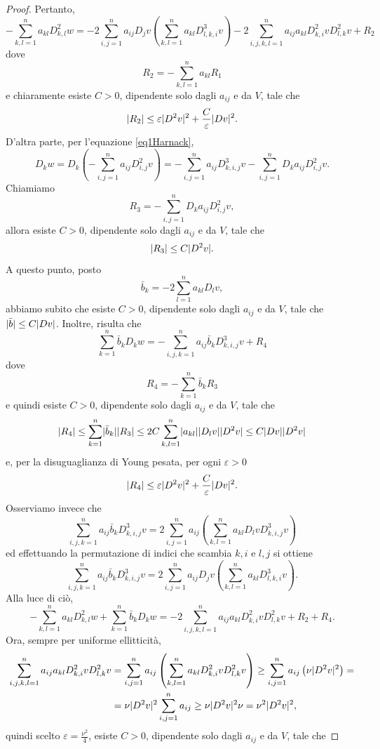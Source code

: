 \begin{proof}
	Pertanto, 
	\[ -\sum_{k,l=1}^{n}a_{kl}D^2_{k,l}w = -2 \sum_{i,j=1}^na_{ij}D_j v \left( \sum_{k,l=1}^n a_{kl}D^3_{l,k,i} v\right)  - 2 \sum_{i,j,k,l=1}^{n} a_{ij}a_{kl}D^2_{k,i}v D^2_{l,k} v + R_2 \]
	dove 
	\[ R_2 = -\sum_{k,l=1}^n a_{kl} R_1 \]
	e chiaramente esiste $C>0$, dipendente solo dagli $a_{ij}$ e da $V$, tale che
	\[ \lvert R_2\rvert \le \varepsilon \lvert D^2 v\rvert^2 + \frac{C}{\varepsilon}\lvert Dv\rvert^2. \]
	D'altra parte, per l'equazione \eqref{eq1Harnack},
	\[ D_k w = D_k \left(-\sum_{i,j=1}^{n}a_{ij}D^2_{i,j}v\right) = - \sum_{i,j=1}^na_{ij}D^3_{k,i,j}v - \sum_{i,j=1}^n D_ka_{ij} D^2_{i,j} v.  \]
	Chiamiamo 
	\[ R_3 = - \sum_{i,j=1}^n D_ka_{ij} D^2_{i,j} v, \]
	allora esiste $C>0$, dipendente solo dagli $a_{ij}$ e da $V$, tale che
	\[ \lvert R_3\rvert \le C \lvert D^2v\rvert. \]
	A questo punto, posto
	\[ \bar{b}_k = -2\sum_{l=1}^{n}a_{kl}D_l v, \]
	abbiamo subito che esiste $C>0$, dipendente solo dagli $a_{ij}$ e da $V$, tale che  $\lvert\bar{b}\rvert \le C \lvert Dv\rvert$. Inoltre, risulta che 
	\[ \sum_{k=1}^{n} \bar{b}_k D_k w = -\sum_{i,j,k=1}^{n} a_{ij}\bar{b}_k D^3_{k,i,j} v + R_4 \]
	dove 
	\[ R_4 = -\sum_{k=1}^{n}\bar{b}_k R_3 \]
	e quindi esiste $C>0$, dipendente solo dagli $a_{ij}$ e da $V$, tale che
	\[ \lvert R_4\rvert \le \sum_{k=1}^{n}\lvert\bar{b}_k\rvert \lvert R_3\rvert \le 2C\sum_{k,l=1}^{n} \lvert a_{kl}\rvert \lvert D_l v\rvert\lvert D^2v\rvert \le C\lvert D v\rvert \lvert D^2 v\rvert   \]
	e, per la disuguaglianza di Young pesata, per ogni $\varepsilon > 0$
	\[ \lvert R_4\rvert \le \varepsilon \lvert D^2 v\rvert^2 + \frac{C}{\varepsilon}\lvert Dv\rvert^2. \]
	Osserviamo invece che 
	\[ \sum_{i,j,k=1}^{n} a_{ij}\bar{b}_k D^3_{k,i,j} v = 2 \sum_{i,j=1}^n a_{ij}\left( \sum_{k,l=1}^n a_{kl} D_l v D^3_{k,i,j} v\right)  \]
	ed effettuando la permutazione di indici che scambia $k,i$ e $l,j$ si ottiene
	\[  \sum_{i,j,k=1}^{n} a_{ij}\bar{b}_k D^3_{k,i,j} v = 2 \sum_{i,j=1}^na_{ij}D_j v \left( \sum_{k,l=1}^n a_{kl}D^3_{l,k,i} v\right). \]
	Alla luce di ciò, 
	\[ -\sum_{k,l=1}^{n}a_{kl}D^2_{k,l}w + \sum_{k=1}^{n} \bar{b}_k D_k w =  - 2 \sum_{i,j,k,l=1}^{n} a_{ij}a_{kl}D^2_{k,i}v D^2_{l,k} v + R_2 + R_4.  \]
	Ora, sempre per uniforme ellitticità, 
	\begin{align*}
		\sum_{i,j,k,l=1}^{n} a_{ij}a_{kl}D^2_{k,i}v D^2_{l,k} v &= \sum_{i,j=1}^{n}  a_{ij} \left( \sum_{k,l=1}^n a_{kl} D^2_{k,i}v D^2_{l,k} v \right) \ge \sum_{i,j=1}^{n}  a_{ij} \left( \nu \lvert D^2 v\rvert^2\right) = \\
		&= \nu \lvert D^2 v\rvert^2 \sum_{i,j=1}^{n}  a_{ij} \ge   \nu \lvert D^2 v\rvert^2  \nu = \nu^2 \lvert D^2 v\rvert^2,
	\end{align*}
	quindi scelto $\varepsilon = \frac{\nu^2}{4}$, esiste $C>0$, dipendente solo dagli $a_{ij}$ e da $V$, tale che

\end{proof}
